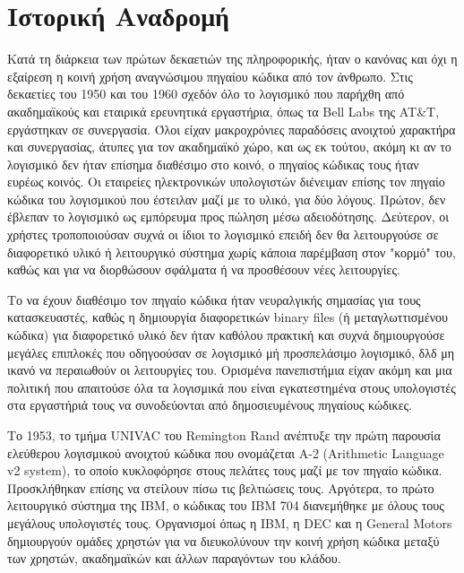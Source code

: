 \documentclass{article}
\begin{document}
{\section{Ιστορική Αναδρομή}
Κατά τη διάρκεια των πρώτων δεκαετιών της πληροφορικής, ήταν ο κανόνας και όχι η εξαίρεση η κοινή χρήση αναγνώσιμου πηγαίου κώδικα από τον άνθρωπο. Στις δεκαετίες του 1950 και του 1960 σχεδόν όλο το λογισμικό που παρήχθη από ακαδημαϊκούς και εταιρικά ερευνητικά εργαστήρια, όπως τα \textlatin{Bell Labs} της  \textlatin{AT&T}, εργάστηκαν σε συνεργασία. Όλοι είχαν μακροχρόνιες παραδόσεις ανοιχτού χαρακτήρα και συνεργασίας, άτυπες για τον ακαδημαϊκό χώρο, και ως εκ τούτου, ακόμη κι αν το λογισμικό δεν ήταν επίσημα διαθέσιμο στο κοινό, ο πηγαίος κώδικας τους ήταν ευρέως κοινός. Οι εταιρείες ηλεκτρονικών υπολογιστών διένειμαν επίσης τον πηγαίο κώδικα του λογισμικού που έστειλαν μαζί με το υλικό, για δύο λόγους. Πρώτον, δεν έβλεπαν το λογισμικό ως εμπόρευμα προς πώληση μέσω αδειοδότησης. Δεύτερον, οι χρήστες τροποποιούσαν συχνά οι ίδιοι το λογισμικό επειδή δεν θα λειτουργούσε σε διαφορετικό υλικό ή λειτουργικό σύστημα χωρίς κάποια παρέμβαση στον "κορμό" του, καθώς και για να διορθώσουν σφάλματα ή να προσθέσουν νέες λειτουργίες.

Το να έχουν διαθέσιμο τον πηγαίο κώδικα ήταν νευραλγικής σημασίας για τους κατασκευαστές, καθώς η δημιουργία διαφορετικών \textlatin{binary files} (ή μεταγλωττισμένου κώδικα) για διαφορετικό υλικό δεν ήταν καθόλου πρακτική και 
συχνά δημιουργούσε μεγάλες επιπλοκές που οδηγοούσαν σε λογισμικό μή προσπελάσιμο λογισμικό, δλδ μη ικανό να περαιωθούν οι λειτουργίες του. Ορισμένα πανεπιστήμια είχαν ακόμη και μια πολιτική που απαιτούσε όλα τα λογισμικά που είναι εγκατεστημένα στους υπολογιστές στα εργαστήριά τους να συνοδεύονται από δημοσιευμένους πηγαίους κώδικες.

Το 1953, το τμήμα \textlatin{UNIVAC} του \textlatin{Remington Rand} ανέπτυξε την πρώτη παρουσία ελεύθερου λογισμικού ανοιχτού κώδικα που ονομάζεται  \textlatin{A-2 (Arithmetic Language v2 system)}, το οποίο κυκλοφόρησε στους πελάτες τους μαζί με τον πηγαίο κώδικα. Προσκλήθηκαν επίσης να στείλουν πίσω τις βελτιώσεις τους. Αργότερα, το πρώτο λειτουργικό σύστημα της  \textlatin{IBM}, ο κώδικας του  \textlatin{IBM 704} διανεμήθηκε με όλους τους μεγάλους υπολογιστές τους. Οργανισμοί όπως η \textlatin{IBM}, η \textlatin{DEC} και η \textlatin{General Motors} δημιουργούν ομάδες χρηστών για να διευκολύνουν την κοινή χρήση κώδικα μεταξύ των χρηστών, ακαδημαϊκών και άλλων
παραγόντων του κλάδου. 

}
\end{document}
